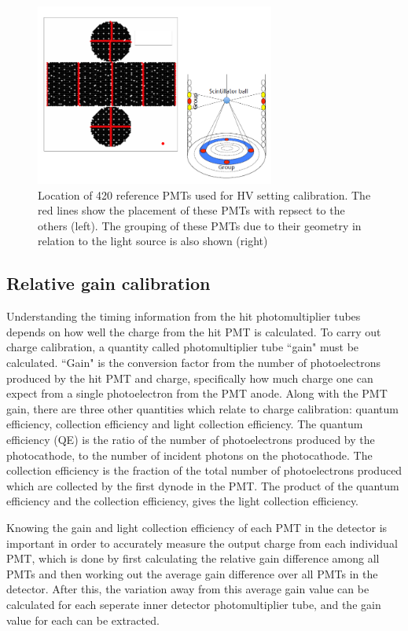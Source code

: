 \begin{figure}
    \centering
    \includegraphics[width=0.7\textwidth]{Figures/hvcalib.png}
\caption{Location of 420 reference PMTs used for HV setting calibration. The red lines show the placement of these PMTs with repsect to the others (left). The grouping of these PMTs due to their geometry in relation to the light source is also shown (right) }
    \label{fig:hvcalib}
\end{figure}




\subsection{Relative gain calibration}

Understanding the timing information from the hit photomultiplier tubes depends on how well the charge from the hit PMT is calculated. To carry out charge calibration, a quantity called photomultiplier tube ``gain" must be calculated. ``Gain" is the conversion factor from the number of photoelectrons produced by the hit PMT and charge, specifically how much charge one can expect from a single photoelectron from the PMT anode. Along with the PMT gain, there are three other quantities which relate to charge calibration: quantum efficiency, collection efficiency and light collection efficiency. 
\newline
The quantum efficiency (QE) is the ratio of the number of photoelectrons produced by the photocathode, to the number of incident photons on the photocathode. The collection efficiency is the fraction of the total number of photoelectrons produced which are collected by the first dynode in the PMT. The product of the quantum efficiency and the collection efficiency, gives the light collection efficiency.  

 Knowing the gain and light collection efficiency of each PMT in the detector is important in order to accurately measure the output charge from each individual PMT, which is done by first calculating the relative gain difference among all PMTs and then working out the average gain difference over all PMTs in the detector. After this, the variation away from this average gain value can be calculated for each seperate inner detector photomultiplier tube, and the gain value for each can be extracted. 

